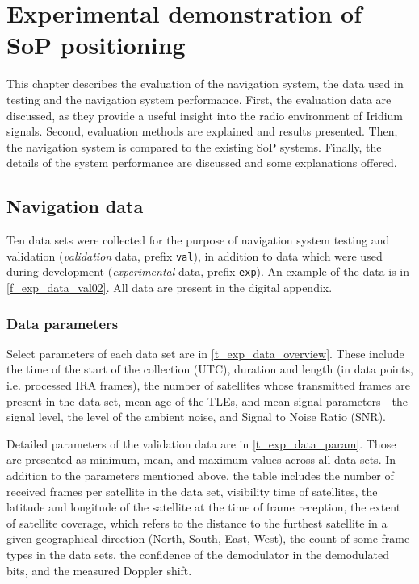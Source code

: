 \chapter{Experimental demonstration of SoP positioning}
\label{s_exp}
This chapter describes the evaluation of the navigation system, the data used in testing and the navigation system performance. First, the evaluation data are discussed, as they provide a useful insight into the radio environment of Iridium signals. Second, evaluation methods are explained and results presented. Then, the navigation system is compared to the existing SoP systems. Finally, the details of the system performance are discussed and some explanations offered.

\section{Navigation data}
Ten data sets were collected for the purpose of navigation system testing and validation (\textit{validation} data, prefix \texttt{val}), in addition to data which were used during development (\textit{experimental} data, prefix \texttt{exp}). An example of the data is in \autoref{f_exp_data_val02}. All data are present in the digital appendix.


\subsection{Data parameters}
Select parameters of each data set are in \autoref{t_exp_data_overview}. These include the time of the start of the collection (UTC), duration and length (in data points, i.e. processed IRA frames), the number of satellites whose transmitted frames are present in the data set, mean age of the TLEs, and mean signal parameters - the signal level, the level of the ambient noise, and Signal to Noise Ratio (SNR). 

Detailed parameters of the validation data are in \autoref{t_exp_data_param}. Those are presented as minimum, mean, and maximum values across all data sets. In addition to the parameters mentioned above, the table includes the number of received frames per satellite in the data set, visibility time of satellites, the latitude and longitude of the satellite at the time of frame reception, the extent of satellite coverage, which refers to the distance to the furthest satellite in a given geographical direction (North, South, East, West), the count of some frame types in the data sets, the confidence of the demodulator in the demodulated bits, and the measured Doppler shift.

